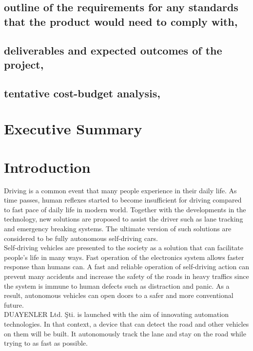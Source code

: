 \documentclass[a4paper,12pt]{article}
\begin{document}
\subsection{outline of the requirements for any standards that the product would need to comply with,}


\subsection{deliverables and expected outcomes of the project,}


\subsection{tentative cost-budget analysis,}


\section{Executive Summary}


\section{Introduction}

Driving is a common event that many people experience in their daily life. As time passes, human reflexes started to become insufficient for driving compared to fast pace of daily life in modern world. Together with the developments in the technology, new solutions are proposed to assist the driver such as lane tracking and emergency breaking systems. The ultimate version of such solutions are considered to be fully autonomous self-driving cars. \\

Self-driving vehicles are presented to the society as a solution that can facilitate people's life in many ways. Fast operation of the electronics system allows faster response than humans can. A fast and reliable operation of self-driving action can prevent many accidents and increase the safety of the roads in heavy traffics since the system is immune to human defects such as distraction and panic. As a result, autonomous vehicles can open doors to a safer and more conventional future.\\

DUAYENLER Ltd. Şti. is launched with the aim of innovating automation technologies. In that context, a device that can detect the road and other vehicles on them will be built. It autonomously track the lane and stay on the road while trying to as fast as possible.\\
\end{document}
